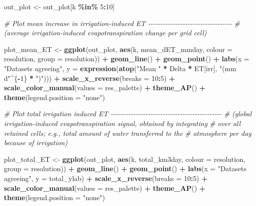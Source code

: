 \documentclass[
  11pt,
]{article}
\newenvironment{Shaded}{\begin{snugshade}}{\end{snugshade}}
\newcommand{\AttributeTok}[1]{\textcolor[rgb]{0.13,0.29,0.53}{#1}}
\newcommand{\CommentTok}[1]{\textcolor[rgb]{0.56,0.35,0.01}{\textit{#1}}}
\newcommand{\DecValTok}[1]{\textcolor[rgb]{0.00,0.00,0.81}{#1}}
\newcommand{\FunctionTok}[1]{\textcolor[rgb]{0.13,0.29,0.53}{\textbf{#1}}}
\newcommand{\NormalTok}[1]{#1}
\newcommand{\OtherTok}[1]{\textcolor[rgb]{0.56,0.35,0.01}{#1}}
\newcommand{\SpecialCharTok}[1]{\textcolor[rgb]{0.81,0.36,0.00}{\textbf{#1}}}
\newcommand{\StringTok}[1]{\textcolor[rgb]{0.31,0.60,0.02}{#1}}
\begin{document}
\begin{Shaded}
\begin{Highlighting}[]
\NormalTok{out\_plot }\OtherTok{\textless{}{-}}\NormalTok{ out\_plot[k }\SpecialCharTok{\%in\%} \DecValTok{5}\SpecialCharTok{:}\DecValTok{10}\NormalTok{]}

\CommentTok{\# Plot mean increase in irrigation{-}induced ET {-}{-}{-}{-}{-}{-}{-}{-}{-}{-}{-}{-}{-}{-}{-}{-}{-}{-}{-}{-}{-}{-}{-}{-}{-}{-}{-}{-}{-}{-}{-}{-}{-}{-}}
\CommentTok{\# (average irrigation{-}induced evapotranspiration change per grid cell)}

\NormalTok{plot\_mean\_ET }\OtherTok{\textless{}{-}} \FunctionTok{ggplot}\NormalTok{(out\_plot, }\FunctionTok{aes}\NormalTok{(k, mean\_dET\_mmday, }\AttributeTok{colour =}\NormalTok{ resolution,}
                                     \AttributeTok{group =}\NormalTok{ resolution)) }\SpecialCharTok{+}
  \FunctionTok{geom\_line}\NormalTok{() }\SpecialCharTok{+}
  \FunctionTok{geom\_point}\NormalTok{() }\SpecialCharTok{+}
  \FunctionTok{labs}\NormalTok{(}\AttributeTok{x =} \StringTok{"Datasets agreeing"}\NormalTok{, }
       \AttributeTok{y =} \FunctionTok{expression}\NormalTok{(}\FunctionTok{atop}\NormalTok{(}\StringTok{"Mean "} \SpecialCharTok{*}\NormalTok{ Delta }\SpecialCharTok{*}\NormalTok{ ET[irr], }\StringTok{"(mm d"}\SpecialCharTok{\^{}}\NormalTok{\{}\SpecialCharTok{{-}}\DecValTok{1}\NormalTok{\} }\SpecialCharTok{*} \StringTok{")"}\NormalTok{))) }\SpecialCharTok{+}
  \FunctionTok{scale\_x\_reverse}\NormalTok{(}\AttributeTok{breaks =} \DecValTok{10}\SpecialCharTok{:}\DecValTok{5}\NormalTok{) }\SpecialCharTok{+}
  \FunctionTok{scale\_color\_manual}\NormalTok{(}\AttributeTok{values =}\NormalTok{ res\_palette) }\SpecialCharTok{+}
  \FunctionTok{theme\_AP}\NormalTok{() }\SpecialCharTok{+}
  \FunctionTok{theme}\NormalTok{(}\AttributeTok{legend.position =} \StringTok{"none"}\NormalTok{)}

\CommentTok{\# Plot total irrigation induced ET {-}{-}{-}{-}{-}{-}{-}{-}{-}{-}{-}{-}{-}{-}{-}{-}{-}{-}{-}{-}{-}{-}{-}{-}{-}{-}{-}{-}{-}{-}{-}{-}{-}{-}{-}{-}{-}{-}{-}{-}{-}{-}{-}{-}{-}}
\CommentTok{\# (global irrigation{-}induced evapotranspiration signal, obtained by integrating}
\CommentTok{\# over all retained cells; e.g., total amount of water transferred to the }
\CommentTok{\# atmosphere per day because of irrigation)}

\NormalTok{plot\_total\_ET }\OtherTok{\textless{}{-}} \FunctionTok{ggplot}\NormalTok{(out\_plot, }\FunctionTok{aes}\NormalTok{(k, total\_km3day, }\AttributeTok{colour =}\NormalTok{ resolution, }\AttributeTok{group =}\NormalTok{ resolution)) }\SpecialCharTok{+}
  \FunctionTok{geom\_line}\NormalTok{() }\SpecialCharTok{+}
  \FunctionTok{geom\_point}\NormalTok{() }\SpecialCharTok{+}
  \FunctionTok{labs}\NormalTok{(}\AttributeTok{x =} \StringTok{"Datasets agreeing"}\NormalTok{, }\AttributeTok{y =}\NormalTok{ total\_ylab) }\SpecialCharTok{+}
  \FunctionTok{scale\_x\_reverse}\NormalTok{(}\AttributeTok{breaks =} \DecValTok{10}\SpecialCharTok{:}\DecValTok{5}\NormalTok{) }\SpecialCharTok{+}
  \FunctionTok{scale\_color\_manual}\NormalTok{(}\AttributeTok{values =}\NormalTok{ res\_palette) }\SpecialCharTok{+}
  \FunctionTok{theme\_AP}\NormalTok{() }\SpecialCharTok{+}
  \FunctionTok{theme}\NormalTok{(}\AttributeTok{legend.position =} \StringTok{"none"}\NormalTok{)}


\end{Highlighting}
\end{Shaded}
\end{document}
